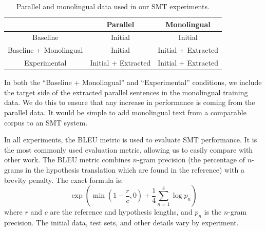 \begin{table}
\begin{center}
\begin{tabular}{|c||c|c|}
\hline
& Parallel & Monolingual \\
\hline
Baseline & Initial & Initial \\
\hline
Baseline + Monolingual & Initial & Initial + Extracted \\
\hline
Experimental & Initial + Extracted & Initial + Extracted \\
\hline
\end{tabular}
\end{center}
\label{tab:exp_setup}
\caption{Parallel and monolingual data used in our SMT experiments.}
\end{table}

In both the ``Baseline + Monolingual'' and ``Experimental'' conditions, we include the target side of
the extracted parallel sentences in the monolingual training data. We do this to
ensure that any increase in performance is coming from the parallel data. It
would be simple to add monolingual text from a comparable corpus to an SMT
system.

In all experiments, the BLEU metric \citep{Papineni02} is used to evaluate SMT
performance. It is the most commonly used evaluation metric, allowing us to
easily compare with other work.
The BLEU metric combines $n$-gram precision  (the percentage of
$n$-grams in the hypothesis translation which are found in the reference) with a
brevity penalty. The exact formula is:
\begin{equation}
\exp(\min(1-\frac{r}{c},0) + \frac{1}{4}\sum^4_{n=1}\log p_n)
\end{equation}
where $r$ and $c$ are the reference and hypothesis lengths, and $p_n$ is the
$n$-gram precision.
The initial data, test sets, and other details vary by experiment.


